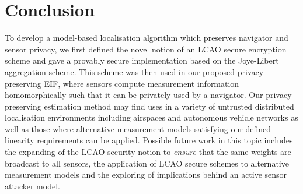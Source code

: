 \documentclass[10pt,journal,compsoc]{IEEEtran}
\theoremstyle{definition}
\theoremstyle{definition}
\theoremstyle{remark}
\begin{document}
\section{Conclusion} \label{sec:conclusion}
To develop a model-based localisation algorithm which preserves navigator and sensor privacy, we first defined the novel notion of an LCAO secure encryption scheme and gave a provably secure implementation based on the Joye-Libert aggregation scheme. This scheme was then used in our proposed privacy-preserving EIF, where sensors compute measurement information homomorphically such that it can be privately used by a navigator. Our privacy-preserving estimation method may find uses in a variety of untrusted distributed localisation environments including airspaces and autonomous vehicle networks as well as those where alternative measurement models satisfying our defined linearity requirements can be applied. Possible future work in this topic includes the expanding of the LCAO security notion to \textit{ensure} that the same weights are broadcast to all sensors, the application of LCAO secure schemes to alternative measurement models and the exploring of implications behind an active sensor attacker model.






%
\end{document}
